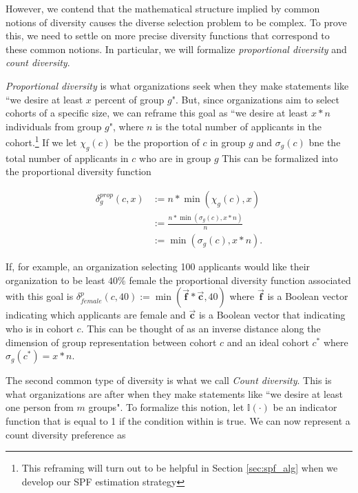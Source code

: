 However, we contend that the mathematical structure implied by common notions of diversity causes the diverse selection problem to be complex. To prove this, we need to settle on more precise diversity functions that correspond to these common notions. In particular, we will formalize \emph{proportional diversity} and \emph{count diversity}. 

\emph{Proportional diversity} is what organizations seek when they make statements like ``we desire at least $x$ percent of group $g$". But, since organizations aim to select cohorts of a specific size, we can reframe this goal as ``we desire at least $x*n$ individuals from group $g$", where $n$ is the total number of applicants in the cohort.\footnote{This reframing will turn out to be helpful in Section \ref{sec:spf_alg} when we develop our SPF estimation strategy} If we let $\chi_g(c)$ be the proportion of $c$ in group $g$ and $\sigma_g(c)$ bne the total number of applicants in $c$ who are in group $g$ This can be formalized into the proportional diversity function

\begin{equation}
    \begin{split}
        \delta_{g}^{prop}(c,x) &:= n*\min(\chi_g(c), x) \\
        & := \frac{n* \min(\sigma_g(c), x*n)}{n} \\ 
        & := \min(\sigma_g(c), x*n). \label{eq:prop_div_function}
    \end{split}
\end{equation}

If, for example, an organization selecting 100 applicants would like their organization to be least $40\%$ female the proportional diversity function associated with this goal is $\delta_{female}^p(c, 40) := \min(\vec{\mathbf{f}}*\vec{\mathbf{c}}, 40)$ where $\vec{\mathbf{f}}$ is a Boolean vector indicating which applicants are female and $\vec{\mathbf{c}}$ is a Boolean vector that indicating who is in cohort $c$. This can be thought of as an inverse distance along the dimension of group representation between cohort $c$ and an ideal cohort $c^*$ where $\sigma_g(c^*) = x*n$.

The second common type of diversity is what we call \emph{Count diversity}. This is what organizations are after when they make statements like ``we desire at least one person from $m$ groups". To formalize this notion, let $\mathbb{I}(\cdot)$ be an indicator function that is equal to 1 if the condition within is true. We can now represent a count diversity preference as

